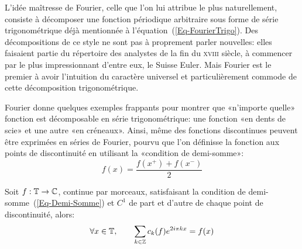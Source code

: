 \begin{histoire}
\medskip
L'idée maîtresse de Fourier, celle que l'on lui attribue le plus naturellement, consiste à décomposer une fonction périodique arbitraire sous forme de série trigonométrique déjà mentionnée à l'équation~(\ref{Eq-FourierTrigo}). Des décompositions de ce style ne sont pas à proprement parler nouvelles: elles faisaient partie du répertoire des analystes de la fin du \textsc{xviii} siècle, à commencer par le plus impressionnant d'entre eux, le Suisse Euler. Mais Fourier est le premier à avoir l'intuition du caractère universel et particulièrement commode de cette décomposition trigonométrique.

Fourier donne quelques exemples frappants pour montrer que «n'importe quelle» fonction est décomposable en série trigonométrique: une fonction «en dents de scie» et une autre «en créneaux». Ainsi, même des fonctions discontinues peuvent être exprimées en séries de Fourier, pourvu que l'on définisse la fonction aux points de discontinuité en utilisant la «condition de demi-somme»:
\begin{equation}\label{Eq-Demi-Somme}
f(x)=\dfrac{f(x^+)+f(x^-)}2
\end{equation}

{}
\begin{theoreme}
Soit $f: \mathbb T\rightarrow\mathbb C$, continue par morceaux, satisfaisant la condition de demi-somme~(\ref{Eq-Demi-Somme}) et $C^1$ de part et d'autre de chaque point de discontinuité, alors:
\begin{equation}
\forall x\in\mathbb T, \qquad \displaystyle\sum_{k\in\mathbb Z} c_k(f)e^{2i\pi kx} = f(x)
\end{equation}
\end{theoreme}


\end{histoire}
